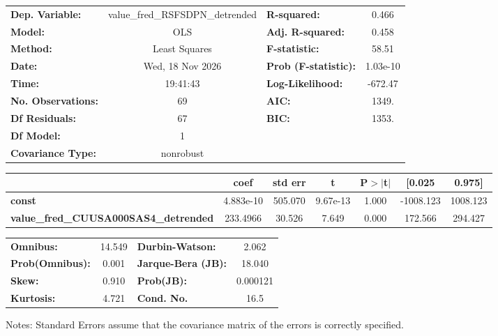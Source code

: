 \begin{center}
\begin{tabular}{lclc}
\toprule
\textbf{Dep. Variable:}                       & value\_fred\_RSFSDPN\_detrended & \textbf{  R-squared:         } &     0.466   \\
\textbf{Model:}                               &               OLS               & \textbf{  Adj. R-squared:    } &     0.458   \\
\textbf{Method:}                              &          Least Squares          & \textbf{  F-statistic:       } &     58.51   \\
\textbf{Date:}                                &         Wed, 18 Nov 2026        & \textbf{  Prob (F-statistic):} &  1.03e-10   \\
\textbf{Time:}                                &             19:41:43            & \textbf{  Log-Likelihood:    } &   -672.47   \\
\textbf{No. Observations:}                    &                  69             & \textbf{  AIC:               } &     1349.   \\
\textbf{Df Residuals:}                        &                  67             & \textbf{  BIC:               } &     1353.   \\
\textbf{Df Model:}                            &                   1             & \textbf{                     } &             \\
\textbf{Covariance Type:}                     &            nonrobust            & \textbf{                     } &             \\
\bottomrule
\end{tabular}
\begin{tabular}{lcccccc}
                                              & \textbf{coef} & \textbf{std err} & \textbf{t} & \textbf{P$> |$t$|$} & \textbf{[0.025} & \textbf{0.975]}  \\
\midrule
\textbf{const}                                &    4.883e-10  &      505.070     &  9.67e-13  &         1.000        &    -1008.123    &     1008.123     \\
\textbf{value\_fred\_CUUSA000SAS4\_detrended} &     233.4966  &       30.526     &     7.649  &         0.000        &      172.566    &      294.427     \\
\bottomrule
\end{tabular}
\begin{tabular}{lclc}
\textbf{Omnibus:}       & 14.549 & \textbf{  Durbin-Watson:     } &    2.062  \\
\textbf{Prob(Omnibus):} &  0.001 & \textbf{  Jarque-Bera (JB):  } &   18.040  \\
\textbf{Skew:}          &  0.910 & \textbf{  Prob(JB):          } & 0.000121  \\
\textbf{Kurtosis:}      &  4.721 & \textbf{  Cond. No.          } &     16.5  \\
\bottomrule
\end{tabular}
\end{center}

Notes: \newline
 [1] Standard Errors assume that the covariance matrix of the errors is correctly specified.